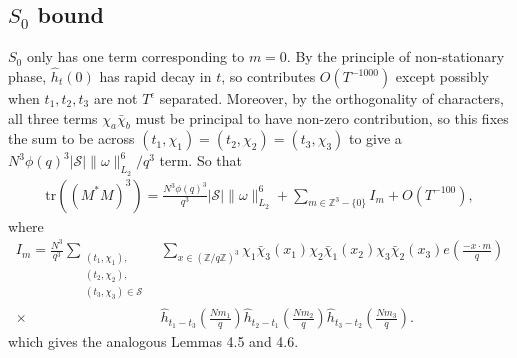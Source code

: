 \subsection{$S_0$ bound}
$S_0$ only has one term corresponding to $m=0$. By the principle of non-stationary phase, $\hat{h}_t(0)$ has rapid decay in $t$, so contributes $O(T^{-1000})$ except possibly when $t_1,t_2,t_3$ are not $T^\epsilon$ separated.
Moreover, by the orthogonality of characters, all three terms $\chi_a\bar{\chi}_b$ must be principal to have non-zero contribution,
so this fixes the sum to be across $(t_1,\chi_1)=(t_2,\chi_2)=(t_3,\chi_3)$ to give a $N^3\phi(q)^3|\mathcal{S}|\|\omega\|_{L_2}^6/q^3$ term.
So that \begin{align*}
    \textrm{tr}((M^*M)^3)=\frac{N^3\phi(q)^3}{q^3}|\mathcal{S}|\|\omega\|_{L_2}^6 + \sum_{m\in\mathbb{Z}^3 - \{0\}} I_m + O(T^{-100}),
\end{align*}
where \begin{align*}
    I_m=\frac{N^3}{q^3}\sum_{\substack{(t_1,\chi_1),\\(t_2,\chi_2),\\(t_3,\chi_3)\in\mathcal{S}}} &\sum_{x\in (\mathbb{Z}/q\mathbb{Z})^3}\chi_1\bar{\chi}_3(x_1)\chi_2\bar{\chi}_1(x_2)\chi_3\bar{\chi}_2(x_3) e\left(\frac{-x\cdot m}{q}\right)\\
    \times \ &\hat{h}_{t_1-t_3}\left(\frac{Nm_1}{q}\right)\hat{h}_{t_2-t_1}\left(\frac{Nm_2}{q}\right)\hat{h}_{t_3-t_2}\left(\frac{Nm_3}{q}\right).
\end{align*}
which gives the analogous Lemmas 4.5 and 4.6.
